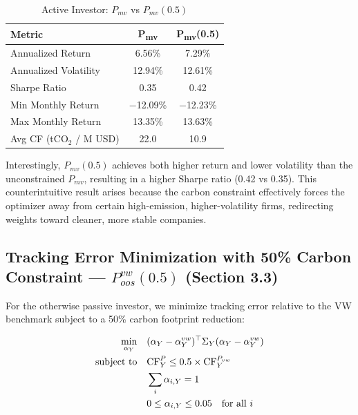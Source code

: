\documentclass[12pt, a4paper]{article}
\begin{document}
\begin{table}[H]
    \centering
    \caption{Active Investor: $P_{mv}$ vs $P_{mv}(0.5)$}
    \label{tab:active}
    \begin{tabular}{lcc}
        \toprule
        \textbf{Metric} & \textbf{P\textsubscript{mv}} & 
        \textbf{P\textsubscript{mv}(0.5)} \\
        \midrule
        Annualized Return       & 6.56\%   & 7.29\%  \\
        Annualized Volatility   & 12.94\%  & 12.61\% \\
        Sharpe Ratio            & 0.35     & 0.42    \\
        Min Monthly Return      & $-$12.09\% & $-$12.23\% \\
        Max Monthly Return      & 13.35\%  & 13.63\% \\
        Avg CF (tCO$_2$ / M USD) & 22.0   & 10.9    \\
        \bottomrule
    \end{tabular}
\end{table}

Interestingly, $P_{mv}(0.5)$ achieves both higher return and lower volatility 
than the unconstrained $P_{mv}$, resulting in a higher Sharpe ratio (0.42 vs 
0.35). This counterintuitive result arises because the carbon constraint 
effectively forces the optimizer away from certain high-emission, 
higher-volatility firms, redirecting weights toward cleaner, more stable 
companies.

\subsection{Tracking Error Minimization with 50\% Carbon Constraint --- 
$P^{vw}_{oos}(0.5)$ (Section 3.3)}

For the otherwise passive investor, we minimize tracking error relative to the 
VW benchmark subject to a 50\% carbon footprint reduction:

\begin{align}
    \min_{\alpha_Y} \quad & (\alpha_Y - \alpha^{vw}_Y)^\top \Sigma_Y 
    (\alpha_Y - \alpha^{vw}_Y) \\
    \text{subject to} \quad 
    & \text{CF}^P_Y \leq 0.5 \times \text{CF}^{P_{vw}}_{Y} \notag \\
    & \sum_i \alpha_{i,Y} = 1 \notag \\
    & 0 \leq \alpha_{i,Y} \leq 0.05 \quad \text{for all } i \notag
\end{align}
\end{document}

